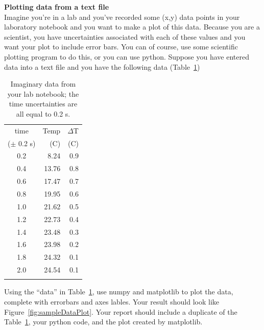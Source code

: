 \begin{prob}
\textbf{\large Plotting data from a text file}\\
Imagine you're in a lab and you've recorded some (x,y) data points in your laboratory notebook and you want to make a plot of this data. Because you are a scientist, you have uncertainties associated with each of these values and you want your plot to include error bars. 
You can of course, use some scientific plotting program to do this, or you can use python. Suppose you have entered data into a text file and you have the following data (Table~\ref{tab:sampleData})
\begin{table}
\caption{Imaginary data from your lab notebook; the time uncertainties are all equal to 0.2 s.}\label{tab:sampleData}
\vspace*{3mm}
\begin{tabular}{crr}
\toprule
time  		& \hspace*{2mm} Temp 	& \hspace*{4mm} $\Delta$T \\
($\pm$ 0.2 s) & (C)     &  (C)   \\
\midrule
0.2		& 8.24	 & 0.9\\
0.4		& 13.76	 & 0.8\\
0.6		& 17.47	 & 0.7\\
0.8		& 19.95	 & 0.6\\
1.0		& 21.62	 & 0.5\\[1mm]
1.2		& 22.73	 & 0.4\\
1.4		& 23.48	 & 0.3\\
1.6		& 23.98	 & 0.2\\
1.8		& 24.32	 & 0.1\\
2.0		& 24.54	 & 0.1\\
\bottomrule
\vspace*{4mm}
\end{tabular}
\end{table}

Using the ``data'' in Table~\ref{tab:sampleData}, use numpy and matplotlib to plot the data, complete with errorbars and axes lables. Your result should look like Figure~\ref{fig:sampleDataPlot}. Your report should include a duplicate of the Table~\ref{tab:sampleData}, your python code, and the plot created by matplotlib.


\end{prob}
